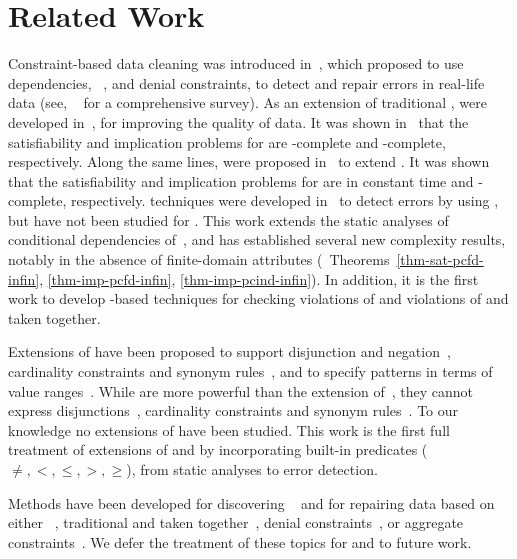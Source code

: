\section{Related Work}
\label{sec-related}


Constraint-based data cleaning was introduced in~\cite{leo99}, which
proposed to use dependencies, \eg~\FDs, \INDs and denial
constraints, to detect and repair errors in real-life data (see,
\eg~\cite{Chomicki07} for a comprehensive survey). As an extension
of traditional \FDs, \CFDs were developed in~\cite{CFDs}, for
improving the quality of data. It was shown in~\cite{CFDs} that the
satisfiability and implication problems for \CFDs are \NP-complete
and \coNP-complete, respectively. Along the same lines, \CINDs were
proposed in~\cite{CINDs} to extend \INDs. It was shown~\cite{CINDs}
that the satisfiability and implication problems for \CINDs are in
constant time and \EXPTIME-complete, respectively. \SQL techniques
were developed in~\cite{CFDs} to detect errors by using \CFDs, but
have not been studied for \CINDs. This work extends the static
analyses of conditional dependencies of~\cite{CFDs,CINDs}, and has
established several new complexity results, notably in the absence
of finite-domain attributes (\eg~Theorems~\ref{thm-sat-pcfd-infin},
\ref{thm-imp-pcfd-infin}, \ref{thm-imp-pcind-infin}). In addition,
it is the first work to develop \SQL-based techniques for checking
violations of \CINDs and violations of \pCFDs and \pCINDs taken
together.

Extensions of \CFDs have been proposed to support disjunction and
negation~\cite{icde08}, cardinality constraints and synonym
rules~\cite{ChenFM09}, and to specify patterns in terms of value
ranges~\cite{divesh08}. While \pCFDs are more powerful than the
extension of~\cite{divesh08}, they cannot express
disjunctions~\cite{icde08}, cardinality constraints and synonym
rules~\cite{ChenFM09}. To our knowledge no extensions of \CINDs have
been studied. This work is the first full treatment of extensions of
\CFDs and \CINDs by incorporating built-in predicates ($\ne, <, \le,
>, \ge$), from static analyses to error detection.

Methods have been developed for discovering
\CFDs~\cite{CM08,divesh08,icde09} and for repairing data based on
either \CFDs~\cite{repair}, traditional \FDs and \INDs taken
together~\cite{sigmod05}, denial
constraints~\cite{BertossiBFL08,ChomickiM05}, or aggregate
constraints~\cite{FlescaFP05}. We defer the treatment of these
topics for \pCFDs and \pCINDs to future work.


